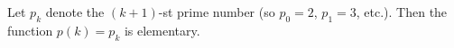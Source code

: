 Let $p_k$ denote the $(k+1)$-st prime number (so $p_0 = 2$, $p_1 = 3$, etc.). Then the function $p(k) = p_k$ is elementary.
